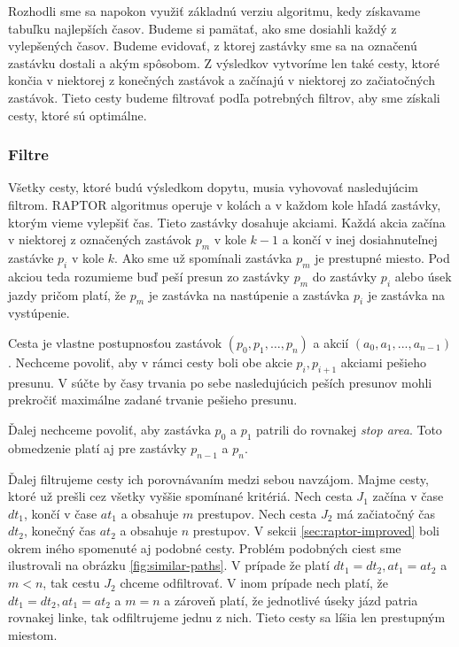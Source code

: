 Rozhodli sme sa napokon využiť základnú verziu algoritmu, kedy získavame tabuľku najlepších časov. Budeme si pamätať, ako sme dosiahli každý z vylepšených časov. Budeme evidovať, z ktorej zastávky sme sa na označenú zastávku dostali a akým spôsobom. Z výsledkov vytvoríme len také cesty, ktoré končia v niektorej z konečných zastávok a začínajú v niektorej zo začiatočných zastávok. Tieto cesty budeme filtrovať podľa potrebných filtrov, aby sme získali cesty, ktoré sú optimálne. 

\subsubsection{Filtre}
Všetky cesty, ktoré budú výsledkom dopytu, musia vyhovovať nasledujúcim filtrom. RAPTOR algoritmus operuje v kolách a v každom kole hľadá zastávky, ktorým vieme vylepšiť čas. Tieto zastávky dosahuje akciami. Každá akcia začína v niektorej z označených zastávok $p_m$ v kole $k-1$ a končí v inej dosiahnuteľnej zastávke $p_i$ v kole $k$.  Ako sme už spomínali zastávka $p_m$ je prestupné miesto. Pod akciou teda rozumieme buď peší presun zo zastávky $p_m$ do zastávky $p_i$ alebo úsek jazdy pričom platí, že $p_m$ je zastávka na nastúpenie a zastávka $p_i$ je zastávka na vystúpenie.

Cesta je vlastne postupnosťou zastávok $(p_0, p_1, …, p_n)$ a akcií $(a_0, a_1, ..., a_{n-1})$. Nechceme povoliť, aby v rámci cesty boli obe akcie $p_i, p_{i+1}$ akciami pešieho presunu. V súčte by časy trvania po sebe nasledujúcich peších presunov mohli prekročiť maximálne zadané trvanie pešieho presunu. 

Ďalej nechceme povoliť, aby zastávka $p_0$ a $p_1$ patrili do rovnakej \textit{stop area}. Toto obmedzenie platí aj pre zastávky $p_{n-1}$ a $p_n$.

Ďalej filtrujeme cesty ich porovnávaním medzi sebou navzájom. Majme cesty, ktoré už prešli cez všetky vyššie spomínané kritériá. Nech cesta $J_1$ začína v čase $dt_1$, končí v čase $at_1$ a obsahuje $m$ prestupov. Nech cesta $J_2$ má začiatočný čas $dt_2$, konečný čas $at_2$ a obsahuje $n$ prestupov. V sekcii \ref{sec:raptor-improved} boli okrem iného spomenuté aj podobné cesty. Problém podobných ciest sme ilustrovali na obrázku \ref{fig:similar-paths}. V prípade že platí $dt_1 = dt_2, at_1=at_2$ a $m < n$, tak cestu $J_2$ chceme odfiltrovať. V inom prípade nech platí, že $dt_1 = dt_2, at_1=at_2$ a $m=n$ a zároveň platí, že jednotlivé úseky jázd patria rovnakej linke, tak odfiltrujeme jednu z nich. Tieto cesty sa líšia len prestupným miestom. 

